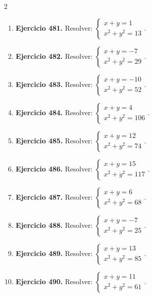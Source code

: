 \documentclass[10pt,a4paper]{article}
\begin{document}
\begin{multicols}{2}
\begin{enumerate}[label=\textbf{\arabic*.}]
\item \textbf{Ejercicio 481.} Resolver: \(\begin{cases}x+y=1\\x^2+y^2=13\end{cases}\).
\item \textbf{Ejercicio 482.} Resolver: \(\begin{cases}x+y=-7\\x^2+y^2=29\end{cases}\).
\item \textbf{Ejercicio 483.} Resolver: \(\begin{cases}x+y=-10\\x^2+y^2=52\end{cases}\).
\item \textbf{Ejercicio 484.} Resolver: \(\begin{cases}x+y=4\\x^2+y^2=106\end{cases}\).
\item \textbf{Ejercicio 485.} Resolver: \(\begin{cases}x+y=12\\x^2+y^2=74\end{cases}\).
\item \textbf{Ejercicio 486.} Resolver: \(\begin{cases}x+y=15\\x^2+y^2=117\end{cases}\).
\item \textbf{Ejercicio 487.} Resolver: \(\begin{cases}x+y=6\\x^2+y^2=68\end{cases}\).
\item \textbf{Ejercicio 488.} Resolver: \(\begin{cases}x+y=-7\\x^2+y^2=25\end{cases}\).
\item \textbf{Ejercicio 489.} Resolver: \(\begin{cases}x+y=13\\x^2+y^2=85\end{cases}\).
\item \textbf{Ejercicio 490.} Resolver: \(\begin{cases}x+y=11\\x^2+y^2=61\end{cases}\).

\end{enumerate}
\end{multicols}
\end{document}
